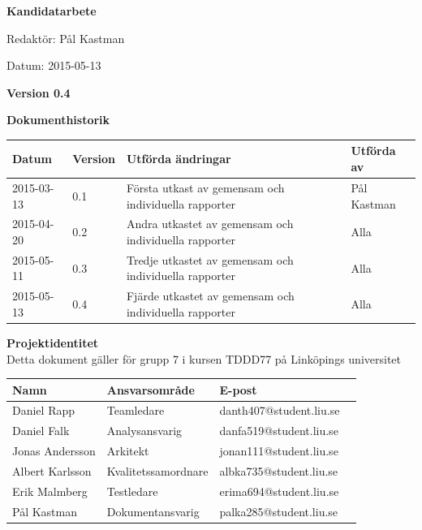 \documentclass{article}
\begin{document}

\begin{titlepage}
\begin{center}
  \textbf{\Huge Kandidatarbete}
\end{center}
\begin{center}
  {\Large Redaktör: Pål Kastman}
\end{center}
\begin{center}
  {\Large Datum: 2015-05-13}
\end{center}
\begin{center}
  {\Large \textbf{Version 0.4}}
\end{center}
\end{titlepage}
\newpage
\begin{flushleft}
  {\Large \textbf{Dokumenthistorik}}\\[0.5ex]
  \begin{center}
  \vspace{3mm}
    \begin{tabular}{ | l | l | p{5cm} | l |}
    \hline
    \textbf{Datum} & \textbf{Version} & \textbf{Utförda ändringar} & \textbf{Utförda av} \\ \hline
    2015-03-13 & 0.1 & Första utkast av gemensam och individuella rapporter & Pål Kastman \\ \hline
    2015-04-20 & 0.2 & Andra utkastet av gemensam och individuella rapporter & Alla \\ \hline
    2015-05-11 & 0.3 & Tredje utkastet av gemensam och individuella rapporter & Alla \\ \hline
	2015-05-13 & 0.4 & Fjärde utkastet av gemensam och individuella rapporter & Alla \\ \hline    
    \end{tabular}
  \end{center}
\end{flushleft}

\hfill

\begin{flushleft}
  {\Large \textbf{Projektidentitet}}\\[0.5ex]
  {\small} Detta dokument gäller för grupp 7  i kursen TDDD77 på Linköpings universitet
  \begin{center}
    \begin{tabular}{ | l | l | p{5cm} | l |}
    \hline
    \textbf{Namn} & \textbf{Ansvarsområde} & \textbf{E-post} \\ \hline
    Daniel Rapp & Teamledare & danth407@student.liu.se \\ \hline
    Daniel Falk & Analysansvarig & danfa519@student.liu.se \\ \hline
    Jonas Andersson & Arkitekt & jonan111@student.liu.se \\ \hline
    Albert Karlsson & Kvalitetssamordnare & albka735@student.liu.se \\ \hline
    Erik Malmberg & Testledare & erima694@student.liu.se \\ \hline
    Pål Kastman & Dokumentansvarig & palka285@student.liu.se \\ \hline
    \end{tabular}
\end{center}
\end{flushleft}
\end{document}
